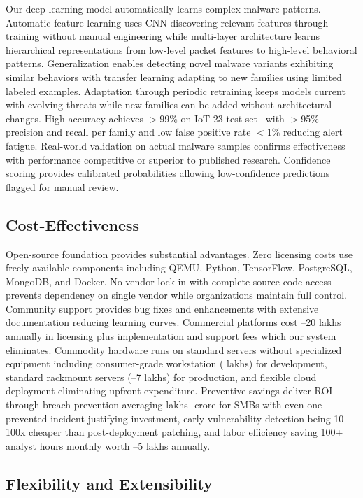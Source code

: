Our deep learning model automatically learns complex malware patterns. Automatic feature learning uses CNN discovering relevant features through training without manual engineering while multi-layer architecture learns hierarchical representations from low-level packet features to high-level behavioral patterns. Generalization enables detecting novel malware variants exhibiting similar behaviors with transfer learning adapting to new families using limited labeled examples. Adaptation through periodic retraining keeps models current with evolving threats while new families can be added without architectural changes. High accuracy achieves $>$99\% on IoT-23 test set~\cite{stratosphere} with $>$95\% precision and recall per family and low false positive rate $<$1\% reducing alert fatigue. Real-world validation on actual malware samples confirms effectiveness with performance competitive or superior to published research. Confidence scoring provides calibrated probabilities allowing low-confidence predictions flagged for manual review.

\subsection{Cost-Effectiveness}

Open-source foundation provides substantial advantages. Zero licensing costs use freely available components including QEMU, Python, TensorFlow, PostgreSQL, MongoDB, and Docker. No vendor lock-in with complete source code access prevents dependency on single vendor while organizations maintain full control. Community support provides bug fixes and enhancements with extensive documentation reducing learning curves. Commercial platforms cost --20 lakhs annually in licensing plus implementation and support fees which our system eliminates. Commodity hardware runs on standard servers without specialized equipment including consumer-grade workstation ( lakhs) for development, standard rackmount servers (--7 lakhs) for production, and flexible cloud deployment eliminating upfront expenditure. Preventive savings deliver ROI through breach prevention averaging  lakhs- crore for SMBs with even one prevented incident justifying investment, early vulnerability detection being 10--100x cheaper than post-deployment patching, and labor efficiency saving 100+ analyst hours monthly worth --5 lakhs annually.

\subsection{Flexibility and Extensibility}

